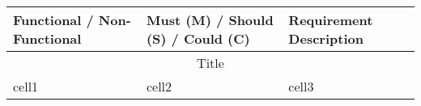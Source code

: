 \documentclass[12pt]{article}
\begin{document}
	\maketitle
		
	\begin{center}
		\begin{tabular}{ |p{3cm}|p{3cm}|p{6cm}| } 
			\hline
		 	Functional / Non-Functional & Must (M) / Should (S) / Could (C) & Requirement Description \\
			\hline
			\multicolumn{3}{|c|}{Title} \\
			\hline
			cell1 & cell2 & cell3 \\
			\hline
		\end{tabular}
	\end{center}
	
\end{document}
